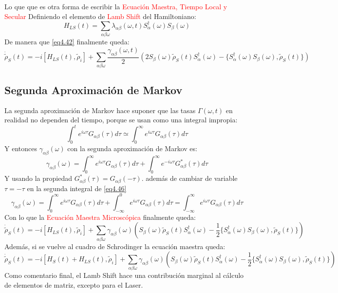 \documentclass{book}
\begin{document}
Lo que que es otra forma de escribir la \textcolor{red}{Ecuación Maestra, Tiempo Local y Secular}
Definiendo el elemento de \textcolor{red}{Lamb Shift} del Hamiltoniano:
\begin{equation}\label{eq4.43}H_{LS}(t)=\sum_{\alpha\beta\omega}\lambda_{\alpha\beta}(\omega,t)S_\alpha^\dag(\omega)S_\beta(\omega)\end{equation}
De manera que \ref{eq4.42} finalmente queda:
\begin{equation}\label{eq4.44}\dot{\tilde{\rho}}_S(t)=-i[H_{LS}(t),\tilde{\rho}_i]+\sum_{\alpha\beta\omega}\frac{\gamma_{\alpha\beta}(\omega,t)}{2}(2S_\beta(\omega)\tilde{\rho}_S(t)S_\alpha^\dag(\omega)-\{S_\alpha^\dag(\omega)S_\beta(\omega),\tilde{\rho}_S(t)\})\end{equation}
\subsection{Segunda Aproximación de Markov}
La segunda aproximación de Markov hace suponer que las tasas $\Gamma(\omega,t)$ en realidad no dependen del tiempo, porque se usan como una integral impropia:
\begin{equation}\label{eq4.45}\int_0^t e^{i\omega\tau}G_{\alpha\beta}(\tau)d\tau\simeq\int_0^\infty e^{i\omega\tau}G_{\alpha\beta}(\tau)d\tau\end{equation}
Y entonces $\gamma_{\alpha\beta}(\omega)$ con la segunda aproximación de Markov es:
\begin{equation}\label{eq4.46}\gamma_{\alpha\beta}(\omega)=\int_0^\infty e^ {i\omega\tau}G_{\alpha\beta}(\tau)d\tau+\int_0^\infty e^ {-i\omega\tau}G^*_{\alpha\beta}(\tau)d\tau\end{equation}
Y usando la propiedad $G_{\alpha\beta}^*(\tau)=G_{\alpha\beta}(-\tau)$. además de cambiar de variable $\tau=-\tau$ en la segunda integral de \ref{eq4.46} \begin{equation}\label{eq4.47}\gamma_{\alpha\beta}(\omega)=\int_0^\infty e^ {i\omega\tau}G_{\alpha\beta}(\tau)d\tau+\int_{-\infty}^0 e^ {i\omega\tau}G_{\alpha\beta}(\tau)d\tau=\int_{-\infty}^\infty e^ {i\omega\tau}G_{\alpha\beta}(\tau)d\tau\end{equation}
Con lo que la \textcolor{red}{Ecuación Maestra Microscópica} finalmente queda:
\begin{equation}\label{eq4.48}\dot{\tilde{\rho}}_S(t)=-i[H_{LS}(t),\tilde{\rho}_i]+\sum_{\alpha\beta\omega}\gamma_{\alpha\beta}(\omega)(S_\beta(\omega)\tilde{\rho}_S(t)S_\alpha^\dag(\omega)-\frac{1}{2}\{S_\alpha^\dag(\omega)S_\beta(\omega),\tilde{\rho}_S(t)\})\end{equation}
Además, si se vuelve al cuadro de Schrodinger la ecuación maestra queda:
\begin{equation}\label{eq4.49}\dot{\tilde{\rho}}_S(t)=-i[H_{S}(t)+H_{LS}(t),\tilde{\rho}_i]+\sum_{\alpha\beta\omega}\gamma_{\alpha\beta}(\omega)(S_\beta(\omega)\tilde{\rho}_S(t)S_\alpha^\dag(\omega)-\frac{1}{2}\{S_\alpha^\dag(\omega)S_\beta(\omega),\tilde{\rho}_S(t)\})\end{equation}
Como comentario final, el Lamb Shift hace una contribución marginal al cálculo de elementos de matriz, excepto para el Laser.
\end{document}
